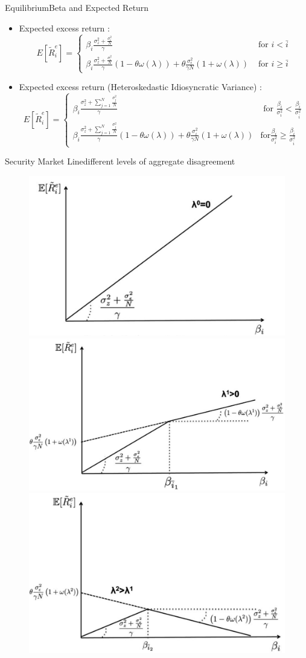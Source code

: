 \documentclass{beamer}
\begin{document}
\begin{frame}{Equilibrium}{Beta and Expected Return}
\begin{itemize}
\item Expected excess return :
\begin{equation*}
E[\tilde{R}_i^e] = \left\{\begin{array}{ll}
\beta_i\frac{\sigma^2_z+\frac{\sigma^2_{\epsilon}}{N}}{\gamma}& \text{ for } i< \bar{i}\\
\beta_i\frac{\sigma^2_z+\frac{\sigma^2_{\epsilon}}{N}}{\gamma}(1-\theta\omega(\lambda)) + \theta  \frac{\sigma^2_{\epsilon}}{\gamma N}(1+\omega(\lambda))& \text{ for } i \geq \bar{i}
\end{array}
\right.
\end{equation*}
\item Expected excess return (Heteroskedastic Idiosyncratic Variance) :
\begin{equation*}
E[\tilde{R}_i^e] = \left\{\begin{array}{ll}
\beta_i\frac{\sigma^2_z+\sum_{j=1}^{N}\frac{\sigma^2_{j}}{N}}{\gamma}& \text{ for } \frac{\beta_i}{\sigma^2_i} < \frac{\beta_{\bar{i}}}{\sigma^2_{\bar{i}}}\\
\beta_i\frac{\sigma^2_z+\sum_{j=1}^{N}\frac{\sigma^2_{j}}{N}}{\gamma}(1-\theta\omega(\lambda)) + \theta  \frac{\sigma^2_{i}}{\gamma N}(1+\omega(\lambda))& \text{for} \frac{\beta_i}{\sigma^2_i} \geq \frac{\beta_{\bar{i}}}{\sigma^2_{\bar{i}}}
\end{array}
\right.
\end{equation*}
\end{itemize}
\hfill\hyperlink{Proof}{}
\end{frame}

\begin{frame}{Security Market Line}{different levels of aggregate disagreement}
\begin{figure}
\centering
\includegraphics[width=0.32\linewidth]{1}
\includegraphics[width=0.32\linewidth]{2}
\includegraphics[width=0.32\linewidth]{3}
\label{fig:indimb}
\end{figure}
\end{frame}
\end{document}
